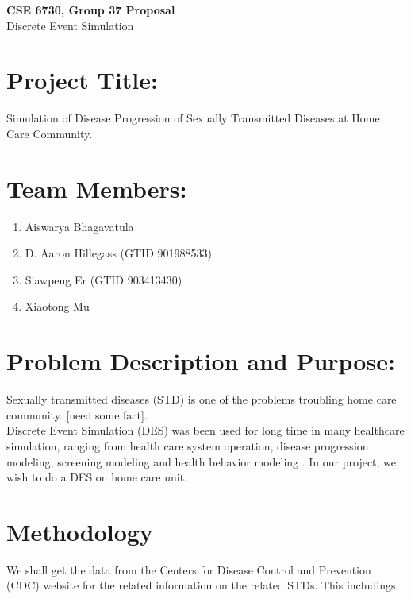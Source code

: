 \documentclass{article}
\begin{document}
	\begin{center}
    
		\LARGE{\textbf{CSE 6730, Group 37 Proposal}} \\
        \vspace{1em}
        \Large{Discrete Event Simulation} \\
     
	\end{center}
    \begin{normalsize}
    
    	\section{Project Title:}
        
Simulation of Disease Progression of Sexually Transmitted Diseases at Home Care Community.
      
		\section{Team Members:}
        
      \begin{enumerate}
      	\item Aiswarya Bhagavatula
      	\item D. Aaron Hillegass (GTID 901988533)
      	\item Siawpeng Er (GTID 903413430)
      	\item Xiaotong Mu 
      \end{enumerate}
        
	   	\section{Problem Description and Purpose:}
        
    Sexually transmitted diseases (STD) is one of the problems troubling home care community. [need some fact].\\
    
    Discrete Event Simulation (DES) was been used for long time in many healthcare simulation, ranging from health care system operation, disease progression modeling, screening modeling and health behavior modeling \cite{lebcir2017, Zhang2018}.  In our project, we wish to do a DES on home care unit. 
        
    \section{Methodology}
    We shall get the data from the Centers for Disease Control and Prevention (CDC) website for the related information on the related STDs. This includings 
    

\end{normalsize}
\end{document}
